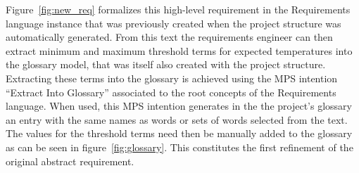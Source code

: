 Figure~\ref{fig:new_req} formalizes this high-level requirement in
the \textsf{Requirements} language instance that was previously created when the 
project structure was automatically generated. From this text the requirements engineer can then
extract minimum and maximum threshold terms for expected temperatures into
the glossary model, that was itself also created with the project structure.
Extracting these terms into the glossary is achieved using the
MPS intention ``Extract Into Glossary'' associated to the root concepts of the
\textsf{Requirements} language. When used, this MPS intention generates in the
the project's glossary an entry with the same names as words
or sets of words selected from the text.
The values for the threshold terms need then be manually added to the glossary
as can be seen in figure~\ref{fig:glossary}.
This constitutes the first refinement of the original abstract requirement.


% 

